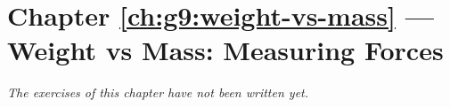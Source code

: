 \section*{Chapter \ref{ch:g9:weight-vs-mass} --- Weight vs Mass: Measuring Forces}


\emph{The exercises of this chapter have not been written yet.}
